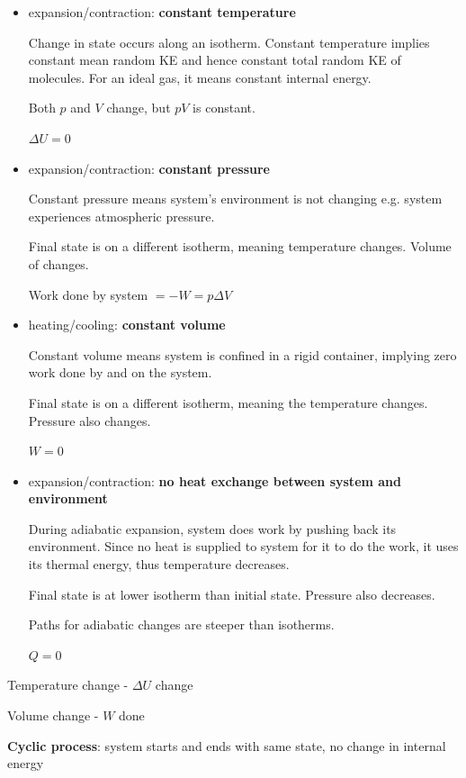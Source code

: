 \begin{itemize}
\item {} expansion/contraction: \textbf{constant temperature}

Change in state occurs along an isotherm. Constant temperature implies constant mean random KE and hence constant total random KE of molecules. For an ideal gas, it means constant internal energy.

Both $p$ and $V$ change, but $pV$ is constant.

$\Delta U=0$

\item {} expansion/contraction: \textbf{constant pressure}

Constant pressure means system's environment is not changing e.g. system experiences atmospheric pressure.

Final state is on a different isotherm, meaning temperature changes. Volume of changes.

Work done by system $=-W=p\Delta V$

\item {} heating/cooling: \textbf{constant volume}

Constant volume means system is confined in a rigid container, implying zero work done by and on the system. 

Final state is on a different isotherm, meaning the temperature changes. Pressure also changes.

$W=0$

\item {} expansion/contraction: \textbf{no heat exchange between system and environment}

During adiabatic expansion, system does work by pushing back its environment. Since no heat is supplied to system for it to do the work, it uses its thermal energy, thus temperature decreases.

Final state is at lower isotherm than initial state. Pressure also decreases.

Paths for adiabatic changes are steeper than isotherms.

$Q=0$
\end{itemize}

Temperature change - $\Delta U$ change

Volume change - $W$ done


\textbf{Cyclic process}: system starts and ends with same state, no change in internal energy

\pagebreak